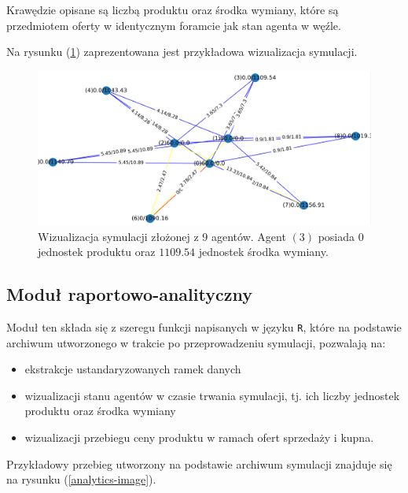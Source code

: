 \documentclass{article}
\begin{document}
Krawędzie opisane są liczbą produktu oraz środka wymiany, które są przedmiotem oferty w identycznym foramcie jak stan agenta w węźle. 

Na rysunku (\ref{vis-image}) zaprezentowana jest przykładowa wizualizacja symulacji.

\begin{figure}[H]
	\centering
	\includegraphics[width=\textwidth, height=0.4\textheight]{./png/vis-image.png}
	\caption{Wizualizacja symulacji złożonej z 9 agentów. Agent $(3)$ posiada 0 jednostek produktu oraz $1109.54$ jednostek środka wymiany.}
	\label{vis-image}
\end{figure}
\subsection{Moduł raportowo-analityczny}

Moduł ten składa się z szeregu funkcji napisanych w języku \texttt{R}, które na podstawie archiwum utworzonego w trakcie po przeprowadzeniu symulacji, pozwalają na:

\begin{itemize}
	\item ekstrakcje ustandaryzowanych ramek danych
	\item wizualizacji stanu agentów w czasie trwania symulacji, tj. ich liczby jednostek produktu oraz środka wymiany
	\item wizualizacji przebiegu ceny produktu w ramach ofert sprzedaży i kupna.
\end{itemize}

Przykładowy przebieg utworzony na podstawie archiwum symulacji znajduje się na rysunku (\ref{analytics-image}).
\end{document}
